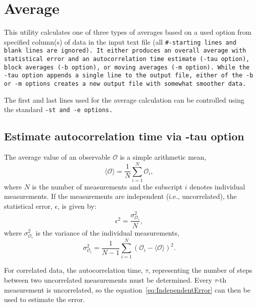 \section{Average} \label{sec:Average}

This utility calculates one of three types of averages based on a used option
from specified column(s) of data in the input text file (all \tt{\#}-starting
lines and blank lines are ignored). It either produces an overall average with
statistical error and an autocorrelation time estimate (\tt{-tau} option),
block averages (\tt{-b} option), or moving averages (\tt{-m} option). While the
\tt{-tau} option appends a single line to the output file, either of the
\tt{-b} or \tt{-m} options creates a new output file with somewhat smoother
data.

The first and last lines used for the average calculation can be controlled
using the standard \tt{-st} and \tt{-e} options.

\subsection{Estimate autocorrelation time via -tau option}

The average value of an observable $\mathcal{O}$ is a simple arithmetic
mean,
\begin{equation} \label{eq:Average} %
  \langle\mathcal{O}\rangle = \frac{1}{N} \sum^N_{i=1} \mathcal{O}_i,
\end{equation} %
where $N$ is the number of measurements and the subscript $i$ denotes
individual measurements. If the measurements are independent (i.e.,
uncorrelated), the statistical error, $\epsilon$, is given by:
\begin{equation} \label{eq:IndependentError} %
  \epsilon^2 =
    \frac{\sigma^2_{\mathcal{O}_i}}{N},
\end{equation} %
where $\sigma^2_{\mathcal{O}_i}$
is the variance of the individual
measurements,
\begin{equation} %
  \sigma^2_{\mathcal{O}_i} = \frac{1}{N-1} \sum^N_{i=1} (\mathcal{O}_i -
  \langle\mathcal{O}\rangle)^2.
\end{equation} %

For correlated data, the autocorrelation time,
$\tau$, representing the number of steps between two uncorrelated
measurements must be determined. Every
$\tau$-th measurement is uncorrelated, so the
equation~\eqref{eq:IndependentError} can then be used to estimate the
error.

